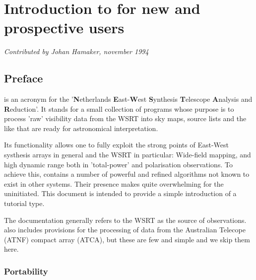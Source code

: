 %
%
\newcommand{\bi}{ \begin{itemize} }
\newcommand{\ei}{ \end{itemize} }
\newcommand{\bn}{ \begin{enumerate} }
\newcommand{\en}{ \end{enumerate} }
\newcommand{\eg}{e.g.}

\chapter{ Introduction to \NEWSTAR for new and prospective users } {\em
Contributed by Johan Hamaker, november 1994 \centering \par}

\tableofcontents


\section{ Preface }
\label{.preface}

	\NEWSTAR is an acronym for the '{\bf N}etherlands {\bf E}ast-{\bf W}est
{\bf S}ynthesis {\bf T}elescope {\bf A}nalysis and {\bf R}eduction'. It stands
for a small collection of programs whose purpose is to process 'raw' visibility
data from the WSRT into sky maps, source lists and the like that are ready for
astronomical interpretation.

	Its functionality allows one to fully exploit the strong points of
East-West systhesis arrays in general and the WSRT in particular: Wide-field
mapping, and high dynamic range both in 'total-power' and polarisation
observations. To achieve this, \NEWSTAR contains a number of powerful and
refined algorithms not known to exist in other systems. Their presence makes
\NEWSTAR quite overwhelming for the uninitiated. This document is intended to
provide a simple introduction of a tutorial type.

	The documentation generally refers to the WSRT as the source of
observations. \NEWSTAR also includes provisions for the processing of data from
the Australian Telecope (ATNF) compact array (ATCA), but these are few and
simple and we skip them here.


\subsection{ Portability }
\label{.portability}

